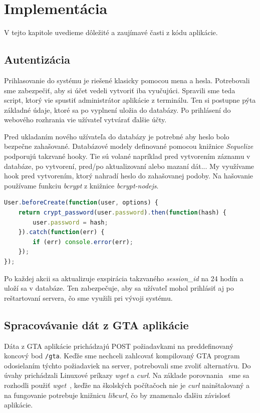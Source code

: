 \chapter{Implementácia}
\label{kap:implementacia}

V tejto kapitole uvedieme dôležité a zaujímavé časti z kódu aplikácie. 

\section{Autentizácia}
\label{sec:authentication}

Prihlasovanie do systému je riešené klasicky pomocou mena a hesla. Potrebovali sme
zabezpečiť, aby si účet vedeli vytvoriť iba vyučujúci. Spravili sme teda script, ktorý
vie spustiť administrátor aplikácie z terminálu. Ten si postupne pýta základné údaje,
ktoré sa po vyplnení uložia do databázy. Po prihlásení do webového rozhrania vie
užívateľ vytvárať ďalšie účty.

Pred ukladaním nového užívateľa do databázy je potrebné aby heslo bolo
bezpečne zahašované. Databázové modely definované pomocou knižnice
\textit{Sequelize} podporujú takzvané hooky. Tie sú volané napríklad
pred vytvorením záznamu v databáze, po vytvorení, pred/po aktualizovaní alebo
mazaní dát... My využívame hook pred vytvorením, ktorý nahradí heslo do zahašovanej
podoby. Na hašovanie používame funkciu \textit{bcrypt} z knižnice
\textit{bcrypt-nodejs}.

\begin{lstlisting}[language=JavaScript]
User.beforeCreate(function(user, options) {
    return crypt_password(user.password).then(function(hash) {
        user.password = hash;
    }).catch(function(err) {
        if (err) console.error(err);
    });
});
\end{lstlisting}

Po každej akcii sa aktualizuje exspirácia takzvaného \textit{session\_id} na 24 hodín
a uloží sa v databáze. Ten zabezpečuje, aby sa užívateľ mohol prihlásiť aj po
reštartovaní servera, čo sme využili pri vývoji systému.

\section{Spracovávanie dát z GTA aplikácie}
\label{sec:gtadataprocessing}

Dáta z GTA aplikácie prichádzajú POST požiadavkami na preddefinovaný
koncový bod \verb'/gta'.
Keďže sme nechceli zahlcovať kompilovaný GTA program odosielaním
týchto požiadaviek na server, potrebovali sme zvoliť alternatívu. Do úvahy prichádzali
Linuxové príkazy \textit{wget} a \textit{curl}. Na základe
porovnania~\cite{bib:curlwget} sme sa rozhodli použiť
\textit{wget}~\cite{bib:wgetmanual},
keďže na školských počítačoch nie je \textit{curl} nainštalovaný a na fungovanie
potrebuje knižnicu \textit{libcurl}, čo by znamenalo ďalšiu závislosť aplikácie.

